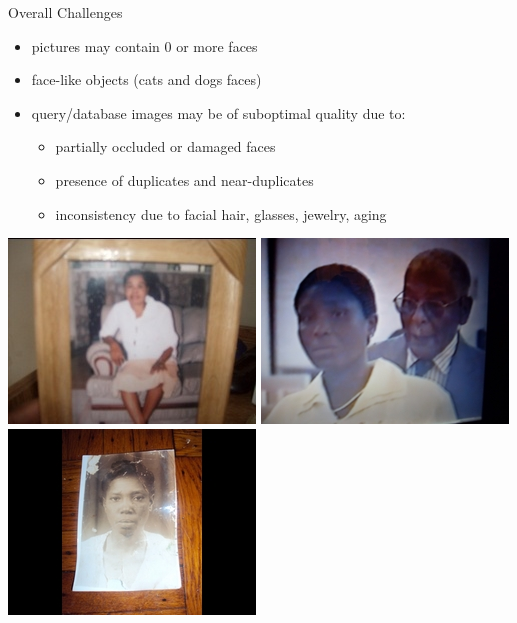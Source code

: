 \begin{xpsectionbox}{Overall Challenges}{}

\begin{minipage}{0.45\linewidth}
\begin{itemize}
	\item pictures may contain $0$ or more faces
	\item face-like objects (cats and dogs faces)
	\item query/database images may be of suboptimal quality due to:
	\begin{itemize}
		\item partially occluded or damaged faces
		\item presence of duplicates and near-duplicates
		\item inconsistency due to facial hair, glasses, jewelry, aging
	\end{itemize}
\end{itemize}
\end{minipage}
\begin{minipage}{0.55\linewidth}
\begin{center}

			\vspace{-1cm}
			
			\includegraphics[height=0.22\linewidth]{images/PL_low_quality}
			\includegraphics[height=0.22\linewidth]{images/HEPL_low_quality}
			\includegraphics[height=0.22\linewidth]{images/HEPL_picture_photo}


\end{center}
\end{minipage}
\end{xpsectionbox}
